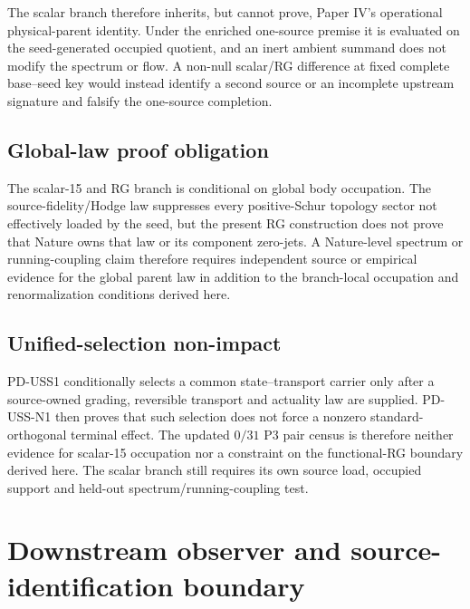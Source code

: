 \documentclass[11pt]{article}
\begin{document}
The scalar branch therefore inherits, but cannot prove, Paper IV's
operational physical-parent identity. Under the enriched one-source premise it
is evaluated on the seed-generated occupied quotient, and an inert ambient
summand does not modify the spectrum or flow. A non-null scalar/RG difference
at fixed complete base--seed key would instead identify a second source or an
incomplete upstream signature and falsify the one-source completion.

\subsection*{Global-law proof obligation}

The scalar-15 and RG branch is conditional on global body occupation.  The
source-fidelity/Hodge law suppresses every positive-Schur topology sector not
effectively loaded by the seed, but the present RG construction does not prove
that Nature owns that law or its component zero-jets.  A Nature-level spectrum
or running-coupling claim therefore requires independent source or empirical
evidence for the global parent law in addition to the branch-local occupation
and renormalization conditions derived here.

\subsection*{Unified-selection non-impact}

PD-USS1 conditionally selects a common state--transport carrier only after a
source-owned grading, reversible transport and actuality law are supplied.
PD-USS-N1 then proves that such selection does not force a nonzero
standard-orthogonal terminal effect. The updated $0/31$ P3 pair census is
therefore neither evidence for scalar-15 occupation nor a constraint on the
functional-RG boundary derived here. The scalar branch still requires its
own source load, occupied support and held-out spectrum/running-coupling test.

\section{Downstream observer and source-identification boundary}
\label{sec:downstream-viic-interface}

\end{document}
